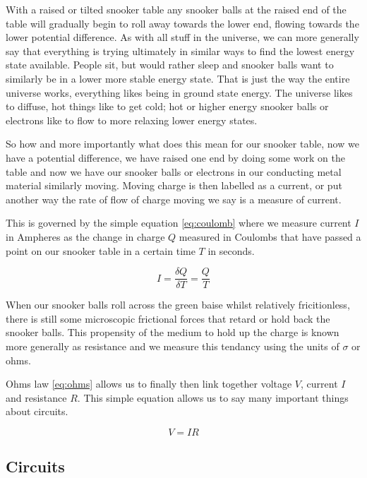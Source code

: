 With a raised or tilted snooker table any snooker balls at the raised end of the table will gradually begin to roll away towards the lower end, flowing towards the lower potential difference. As with all stuff in the universe, we can more generally say that everything is trying ultimately in similar ways to find the lowest energy state available. People sit, but would rather sleep and snooker balls want to similarly be in a lower more stable energy state. That is just the way the entire universe works, everything likes being in ground state energy. The universe likes to diffuse, hot things like to get cold; hot or higher energy snooker balls or electrons like to flow to more relaxing lower energy states.  

So how and more importantly what does this mean for our snooker table, now we have a potential difference, we have raised one end by doing some work on the table and now we have our snooker balls or electrons in our conducting metal material similarly moving. Moving charge is then labelled as a current, or put another way the rate of flow of charge moving we say is a measure of current. 

This is governed by the simple equation \eqref{eq:coulomb} where we measure current $I$ in Ampheres as the change in charge $Q$ measured in Coulombs that have passed a point on our snooker table in a certain time $T$ in seconds. 

\begin{equation}
 I = \frac{\delta Q}{\delta T} = \frac{Q}{T}
\label{eq:coulomb}
\end{equation}

When our snooker balls roll across the green baise whilst relatively fricitionless, there is still some microscopic frictional forces that retard or hold back the snooker balls. This propensity of the medium to hold up the charge is known more generally as resistance and we measure this tendancy using the units of $\sigma$ or ohms. 

Ohms law \eqref{eq:ohms} allows us to finally then link together voltage $V$, current $I$ and resistance $R$. This simple equation allows us to say many important things about circuits.

\begin{equation}
 V = IR
\label{eq:ohms}
\end{equation}

\subsection{Circuits}

